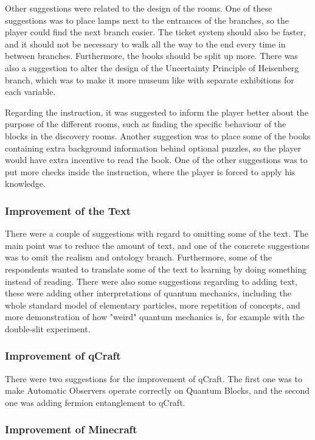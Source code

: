 \documentclass[11pt,twoside]{report} %
\begin{document}
Other suggestions were related to the design of the rooms. One of these suggestions was to place lamps next to the entrances of the branches, so the player could find the next branch easier. The ticket system should also be faster, and it should not be necessary to walk all the way to the end every time in between branches. Furthermore, the books should be split up more. There was also a suggestion to alter the design of the Uncertainty Principle of Heisenberg branch, which was to make it more museum like with separate exhibitions for each variable.

Regarding the instruction, it was suggested to inform the player better about the purpose of the different rooms, such as finding the specific behaviour of the blocks in the discovery rooms. Another suggestion was to place some of the books containing extra background information behind optional puzzles, so the player would have extra incentive to read the book. One of the other suggestions was to put more checks inside the instruction, where the player is forced to apply his knowledge.

\subsubsection{Improvement of the Text}

There were a couple of suggestions with regard to omitting some of the text. The main point was to reduce the amount of text, and one of the concrete suggestions was to omit the realism and ontology branch. Furthermore, some of the respondents wanted to translate some of the text to learning by doing something instead of reading. There were also some suggestions regarding to adding text, these were adding other interpretations of quantum mechanics, including the whole standard model of elementary particles, more repetition of concepts, and more demonstration of how "weird" quantum mechanics is, for example with the double-slit experiment. 

\subsubsection{Improvement of qCraft}

There were two suggestions for the improvement of qCraft. The first one was to make Automatic Observers operate correctly on Quantum Blocks, and the second one was adding fermion entanglement to qCraft.

\subsubsection{Improvement of Minecraft}
\end{document}
